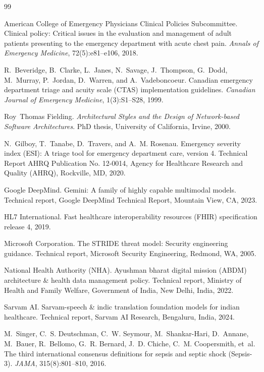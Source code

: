 \documentclass[11pt,a4paper,oneside]{report}
\begin{document}
\begin{thebibliography}{99}

American College of Emergency Physicians Clinical Policies Subcommittee.
\newblock Clinical policy: Critical issues in the evaluation and management of adult patients presenting to the emergency department with acute chest pain.
\newblock \textit{Annals of Emergency Medicine}, 72(5):e81--e106, 2018.

R.~Beveridge, B.~Clarke, L.~Janes, N.~Savage, J.~Thompson, G.~Dodd, M.~Murray, P.~Jordan, D.~Warren, and A.~Vadeboncoeur.
\newblock Canadian emergency department triage and acuity scale (CTAS) implementation guidelines.
\newblock \textit{Canadian Journal of Emergency Medicine}, 1(3):S1--S28, 1999.

Roy~Thomas Fielding.
\newblock \textit{Architectural Styles and the Design of Network-based Software Architectures}.
\newblock PhD thesis, University of California, Irvine, 2000.

N.~Gilboy, T.~Tanabe, D.~Travers, and A.~M. Rosenau.
\newblock Emergency severity index (ESI): A triage tool for emergency department care, version 4.
\newblock Technical Report AHRQ Publication No. 12-0014, Agency for Healthcare Research and Quality (AHRQ), Rockville, MD, 2020.

Google DeepMind.
\newblock Gemini: A family of highly capable multimodal models.
\newblock Technical report, Google DeepMind Technical Report, Mountain View, CA, 2023.

HL7 International.
\newblock Fast healthcare interoperability resources (FHIR) specification release 4, 2019.

Microsoft Corporation.
\newblock The STRIDE threat model: Security engineering guidance.
\newblock Technical report, Microsoft Security Engineering, Redmond, WA, 2005.

National Health Authority (NHA).
\newblock Ayushman bharat digital mission (ABDM) architecture \& health data management policy.
\newblock Technical report, Ministry of Health and Family Welfare, Government of India, New Delhi, India, 2022.

Sarvam AI.
\newblock Sarvam-speech \& indic translation foundation models for indian healthcare.
\newblock Technical report, Sarvam AI Research, Bengaluru, India, 2024.

M.~Singer, C.~S. Deutschman, C.~W. Seymour, M.~Shankar-Hari, D.~Annane, M.~Bauer, R.~Bellomo, G.~R. Bernard, J.~D. Chiche, C.~M. Coopersmith, et~al.
\newblock The third international consensus definitions for sepsis and septic shock (Sepsis-3).
\newblock \textit{JAMA}, 315(8):801--810, 2016.


\end{thebibliography}
\end{document}
